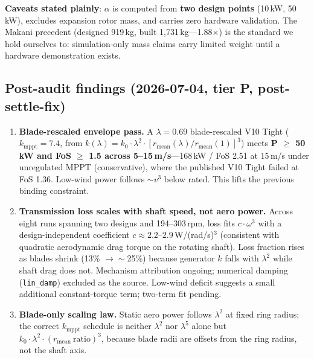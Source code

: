 \documentclass[11pt,a4paper]{article}
\begin{document}
\textbf{Caveats stated plainly}: $\alpha$ is computed from \textbf{two design points}
(10\,kW, 50\,kW), excludes expansion rotor mass, and carries zero hardware validation.
The Makani precedent (designed 919\,kg, built 1,731\,kg---1.88$\times$) is the standard
we hold ourselves to: simulation-only mass claims carry limited weight until a hardware
demonstration exists.

\subsection{Post-audit findings (2026-07-04, tier P, post-settle-fix)}
\label{sec:postaudit}

\begin{enumerate}
\item \textbf{Blade-rescaled envelope pass.}
      A $\lambda = 0.69$ blade-rescaled V10 Tight
      ($k_{\text{mppt}} = 7.4$, from $k(\lambda) = k_0 \cdot \lambda^2 \cdot [r_{\text{mean}}(\lambda)/r_{\text{mean}}(1)]^3$)
      meets \textbf{P $\geq$ 50\,kW and FoS $\geq$ 1.5 across 5--15\,m/s}---168\,kW / FoS 2.51
      at 15\,m/s under unregulated MPPT (conservative), where the published V10 Tight
      failed at FoS 1.36.
      Low-wind power follows $\sim v^3$ below rated.
      This lifts the previous binding constraint.

\item \textbf{Transmission loss scales with shaft speed, not aero power.}
      Across eight runs spanning two designs and 194--303\,rpm, loss fits $c \cdot \omega^3$
      with a design-independent coefficient $c \approx 2.2$--$2.9$\,W/(rad/s)$^3$ (consistent
      with quadratic aerodynamic drag torque on the rotating shaft).
      Loss fraction rises as blades shrink (13\% $\rightarrow \sim$25\%) because generator $k$
      falls with $\lambda^2$ while shaft drag does not.
      Mechanism attribution ongoing; numerical damping (\texttt{lin\_damp}) excluded as the source.
      Low-wind deficit suggests a small additional constant-torque term; two-term fit pending.

\item \textbf{Blade-only scaling law.}
      Static aero power follows $\lambda^2$ at fixed ring radius;
      the correct $k_{\text{mppt}}$ schedule is neither $\lambda^2$ nor $\lambda^5$ alone
      but $k_0 \cdot \lambda^2 \cdot (r_{\text{mean}}\ \text{ratio})^3$, because blade radii
      are offsets from the ring radius, not the shaft axis.
\end{enumerate}
\end{document}
